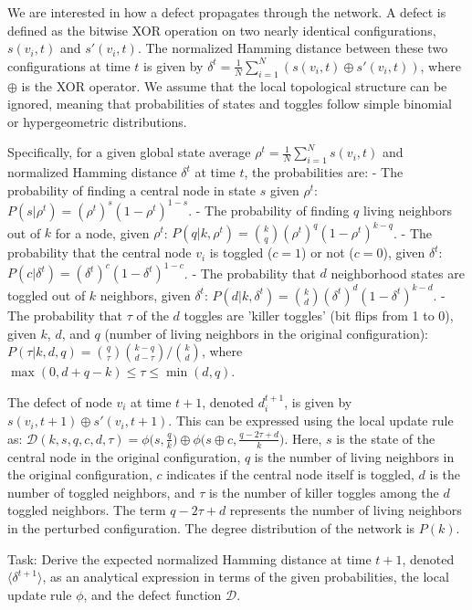 \documentclass[10pt]{article}
\begin{document}
We are interested in how a defect propagates through the network. A defect is defined as the bitwise XOR operation on two nearly identical configurations, $s(v_i, t)$ and $s'(v_i, t)$. The normalized Hamming distance between these two configurations at time $t$ is given by $\delta^t = \frac{1}{N}\sum_{i=1}^N (s(v_i, t) \oplus s'(v_i, t))$, where $\oplus$ is the XOR operator. We assume that the local topological structure can be ignored, meaning that probabilities of states and toggles follow simple binomial or hypergeometric distributions.

Specifically, for a given global state average $\rho^t = \frac{1}{N}\sum_{i=1}^N s(v_i, t)$ and normalized Hamming distance $\delta^t$ at time $t$, the probabilities are:
- The probability of finding a central node in state $s$ given $\rho^t$: $P(s | \rho^t) = (\rho^t)^s (1-\rho^t)^{1-s}$.
- The probability of finding $q$ living neighbors out of $k$ for a node, given $\rho^t$: $P(q | k, \rho^t) = \binom{k}{q} (\rho^t)^q (1-\rho^t)^{k-q}$.
- The probability that the central node $v_i$ is toggled ($c=1$) or not ($c=0$), given $\delta^t$: $P(c|\delta^t) = (\delta^t)^c (1-\delta^t)^{1-c}$.
- The probability that $d$ neighborhood states are toggled out of $k$ neighbors, given $\delta^t$: $P(d|k,\delta^t) = \binom{k}{d}(\delta^t)^d (1-\delta^t)^{k-d}$.
- The probability that $\tau$ of the $d$ toggles are 'killer toggles' (bit flips from 1 to 0), given $k$, $d$, and $q$ (number of living neighbors in the original configuration): $P(\tau|k, d, q) = \binom{q}{\tau}\binom{k-q}{d-\tau} \bigg/ \binom{k}{d}$, where $\max(0, d+q-k) \leq \tau \leq \min(d,q)$.

The defect of node $v_i$ at time $t+1$, denoted $d_i^{t+1}$, is given by $s(v_i, t+1) \oplus s'(v_i, t+1)$. This can be expressed using the local update rule as:
$\mathcal{D}(k, s, q, c, d, \tau) = \phi\bigg(s, \frac{q}{k}\bigg) \oplus \phi\bigg(s\oplus c, \frac{q-2\tau+d}{k}\bigg)$.
Here, $s$ is the state of the central node in the original configuration, $q$ is the number of living neighbors in the original configuration, $c$ indicates if the central node itself is toggled, $d$ is the number of toggled neighbors, and $\tau$ is the number of killer toggles among the $d$ toggled neighbors. The term $q-2\tau+d$ represents the number of living neighbors in the perturbed configuration. The degree distribution of the network is $P(k)$.

Task:
Derive the expected normalized Hamming distance at time $t+1$, denoted $\langle\delta^{t+1}\rangle$, as an analytical expression in terms of the given probabilities, the local update rule $\phi$, and the defect function $\mathcal{D}$.
\end{document}
